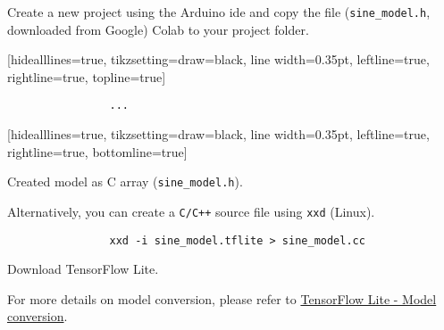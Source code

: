 \begin{frame}[fragile]
    \par Create a new project using the Arduino\textregistered{} \acs{ide} and copy the file (\texttt{sine\_model.h}, downloaded from Google) Colab to your project folder.
    \begin{listing}[H]
        [hidealllines=true, tikzsetting={draw=black, line width=0.35pt}, leftline=true, rightline=true, topline=true]
        \vspace{-1.25em}
        \begin{mdframed}[hidealllines=true, tikzsetting={draw=black, line width=0.35pt}, leftline=true, rightline=true]
            \begin{verbatim}
                ...
            \end{verbatim}
        \end{mdframed}
        \vspace{-1.25em}
        [hidealllines=true, tikzsetting={draw=black, line width=0.35pt}, leftline=true, rightline=true, bottomline=true]
        \caption{Created model as C array (\texttt{sine\_model.h}).}
        \label{lst:tflite:sinewave:model:c_array}
    \end{listing}
    \par Alternatively, you can create a \texttt{C/C++} source file using \texttt{xxd} (Linux).
    \begin{listing}[H]
        \begin{mdframed}
            \begin{verbatim}
                xxd -i sine_model.tflite > sine_model.cc
            \end{verbatim}
        \end{mdframed}
        \caption{Download TensorFlow Lite.}
        \label{lst:tflite:sinewave:model:conversion}
    \end{listing}
    \par For more details on model conversion, please refer to \href{https://www.tensorflow.org/lite/microcontrollers/build\_convert\#model\_conversion}{TensorFlow Lite - Model conversion}.
\end{frame}
